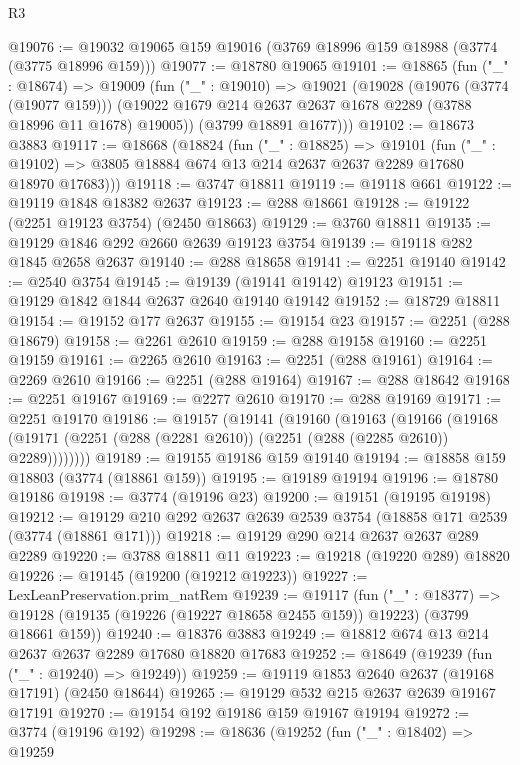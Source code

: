 \begin{lexlean}{R3}
\begin{coremodule}
@19076 := @19032 @19065 @159 @19016 (@3769 @18996 @159 @18988 (@3774 (@3775 @18996 @159)))
@19077 := @18780 @19065
@19101 := @18865
    (fun ("_" : @18674) =>
    @19009
      (fun ("_" : @19010) =>
      @19021
        (@19028
          (@19076 (@3774 (@19077 @159)))
          (@19022 @1679 @214 @2637 @2637 @1678 @2289 (@3788 @18996 @11 @1678) @19005))
        (@3799 @18891 @1677)))
@19102 := @18673 @3883
@19117 := @18668
    (@18824
      (fun ("_" : @18825) =>
      @19101
        (fun ("_" : @19102) => @3805 @18884 @674 @13 @214 @2637 @2637 @2289 @17680 @18970 @17683)))
@19118 := @3747 @18811
@19119 := @19118 @661
@19122 := @19119 @1848 @18382 @2637
@19123 := @288 @18661
@19128 := @19122 (@2251 @19123 @3754) (@2450 @18663)
@19129 := @3760 @18811
@19135 := @19129 @1846 @292 @2660 @2639 @19123 @3754
@19139 := @19118 @282 @1845 @2658 @2637
@19140 := @288 @18658
@19141 := @2251 @19140
@19142 := @2540 @3754
@19145 := @19139 (@19141 @19142) @19123
@19151 := @19129 @1842 @1844 @2637 @2640 @19140 @19142
@19152 := @18729 @18811
@19154 := @19152 @177 @2637
@19155 := @19154 @23
@19157 := @2251 (@288 @18679)
@19158 := @2261 @2610
@19159 := @288 @19158
@19160 := @2251 @19159
@19161 := @2265 @2610
@19163 := @2251 (@288 @19161)
@19164 := @2269 @2610
@19166 := @2251 (@288 @19164)
@19167 := @288 @18642
@19168 := @2251 @19167
@19169 := @2277 @2610
@19170 := @288 @19169
@19171 := @2251 @19170
@19186 := @19157
    (@19141
      (@19160
        (@19163
          (@19166
            (@19168 (@19171 (@2251 (@288 (@2281 @2610)) (@2251 (@288 (@2285 @2610)) @2289))))))))
@19189 := @19155 @19186 @159 @19140
@19194 := @18858 @159 @18803 (@3774 (@18861 @159))
@19195 := @19189 @19194
@19196 := @18780 @19186
@19198 := @3774 (@19196 @23)
@19200 := @19151 (@19195 @19198)
@19212 := @19129 @210 @292 @2637 @2639 @2539 @3754 (@18858 @171 @2539 (@3774 (@18861 @171)))
@19218 := @19129 @290 @214 @2637 @2637 @289 @2289
@19220 := @3788 @18811 @11
@19223 := @19218 (@19220 @289) @18820
@19226 := @19145 (@19200 (@19212 @19223))
@19227 := LexLeanPreservation.prim_natRem
@19239 := @19117
    (fun ("_" : @18377) =>
    @19128 (@19135 (@19226 (@19227 @18658 @2455 @159)) @19223) (@3799 @18661 @159))
@19240 := @18376 @3883
@19249 := @18812 @674 @13 @214 @2637 @2637 @2289 @17680 @18820 @17683
@19252 := @18649 (@19239 (fun ("_" : @19240) => @19249))
@19259 := @19119 @1853 @2640 @2637 (@19168 @17191) (@2450 @18644)
@19265 := @19129 @532 @215 @2637 @2639 @19167 @17191
@19270 := @19154 @192 @19186 @159 @19167 @19194
@19272 := @3774 (@19196 @192)
@19298 := @18636
    (@19252
      (fun ("_" : @18402) =>
      @19259

\end{coremodule}
\end{lexlean}
